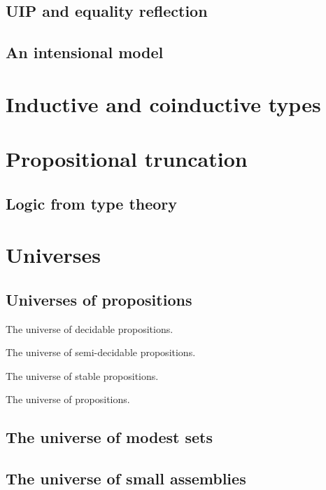 \subsection{UIP and equality reflection}
\label{sec:uip-equal-refl}

\subsection{An intensional model}
\label{sec:an-intensional-model}



\section{Inductive and coinductive types}
\label{sec:inductive-counductive-types}


\section{Propositional truncation}
\label{sec:prop-trunc}

\subsection{Logic from type theory}
\label{sec:logic-from-type}

\section{Universes}
\label{sec:universes}

\subsection{Universes of propositions}
\label{sec:universe-propositions}

The universe of decidable propositions.

The universe of semi-decidable propositions.

The universe of stable propositions.

The universe of propositions.

\subsection{The universe of modest sets}
\label{sec:universe-modest-sets}

\subsection{The universe of small assemblies}
\label{sec:univ-small-assembl}



